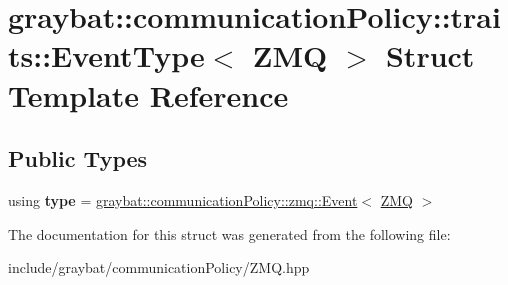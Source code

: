 \hypertarget{structgraybat_1_1communicationPolicy_1_1traits_1_1EventType_3_01ZMQ_01_4}{}\section{graybat\+:\+:communication\+Policy\+:\+:traits\+:\+:Event\+Type$<$ Z\+M\+Q $>$ Struct Template Reference}
\label{structgraybat_1_1communicationPolicy_1_1traits_1_1EventType_3_01ZMQ_01_4}
\subsection*{Public Types}
\begin{DoxyCompactItemize}
\item 
\hypertarget{structgraybat_1_1communicationPolicy_1_1traits_1_1EventType_3_01ZMQ_01_4_ad1060314cd32bdea0775e45d19266976}{}using {\bfseries type} = \hyperlink{classgraybat_1_1communicationPolicy_1_1zmq_1_1Event}{graybat\+::communication\+Policy\+::zmq\+::\+Event}$<$ \hyperlink{structgraybat_1_1communicationPolicy_1_1ZMQ}{Z\+M\+Q} $>$\label{structgraybat_1_1communicationPolicy_1_1traits_1_1EventType_3_01ZMQ_01_4_ad1060314cd32bdea0775e45d19266976}

\end{DoxyCompactItemize}


The documentation for this struct was generated from the following file\+:\begin{DoxyCompactItemize}
\item 
include/graybat/communication\+Policy/Z\+M\+Q.\+hpp\end{DoxyCompactItemize}
